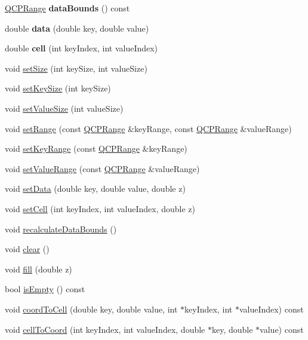 \begin{DoxyCompactItemize}
\item 
\hyperlink{classQCPRange}{Q\+C\+P\+Range} {\bfseries data\+Bounds} () const \hypertarget{classQCPColorMapData_a9ff433248ee226ea0c469ae6cc2489fd}{}\label{classQCPColorMapData_a9ff433248ee226ea0c469ae6cc2489fd}

\item 
double {\bfseries data} (double key, double value)\hypertarget{classQCPColorMapData_a2c33807b008cdb9e1394245c294c0eaf}{}\label{classQCPColorMapData_a2c33807b008cdb9e1394245c294c0eaf}

\item 
double {\bfseries cell} (int key\+Index, int value\+Index)\hypertarget{classQCPColorMapData_af51ecd21f347adbf87b4cce4e1f5cbd6}{}\label{classQCPColorMapData_af51ecd21f347adbf87b4cce4e1f5cbd6}

\item 
void \hyperlink{classQCPColorMapData_a0d9ff35c299d0478b682bfbcdd9c097e}{set\+Size} (int key\+Size, int value\+Size)
\item 
void \hyperlink{classQCPColorMapData_ac7ef70e383aface34b44dbde49234b6b}{set\+Key\+Size} (int key\+Size)
\item 
void \hyperlink{classQCPColorMapData_a0893c9e3914513048b45e3429ffd16f2}{set\+Value\+Size} (int value\+Size)
\item 
void \hyperlink{classQCPColorMapData_aad9c1c7c703c1339489fc730517c83d4}{set\+Range} (const \hyperlink{classQCPRange}{Q\+C\+P\+Range} \&key\+Range, const \hyperlink{classQCPRange}{Q\+C\+P\+Range} \&value\+Range)
\item 
void \hyperlink{classQCPColorMapData_a0738c485f3c9df9ea1241b7a8bb6a86e}{set\+Key\+Range} (const \hyperlink{classQCPRange}{Q\+C\+P\+Range} \&key\+Range)
\item 
void \hyperlink{classQCPColorMapData_ada1b2680ba96a5f4175b6d341cf75d23}{set\+Value\+Range} (const \hyperlink{classQCPRange}{Q\+C\+P\+Range} \&value\+Range)
\item 
void \hyperlink{classQCPColorMapData_afd2083ccfd6987ec94aa7ef8e91ca39a}{set\+Data} (double key, double value, double z)
\item 
void \hyperlink{classQCPColorMapData_a8e75eaf8746596319032a93f3d2d0683}{set\+Cell} (int key\+Index, int value\+Index, double z)
\item 
void \hyperlink{classQCPColorMapData_ab235ade8a4d64bd3adb26a99b3dd57ee}{recalculate\+Data\+Bounds} ()
\item 
void \hyperlink{classQCPColorMapData_a9910ba830e96955bd5c8e5bef1e77ef3}{clear} ()
\item 
void \hyperlink{classQCPColorMapData_a350f783260eb9b5de5c7b5e0d5d3e3c2}{fill} (double z)
\item 
bool \hyperlink{classQCPColorMapData_a986009324aee1fc5f696db46bd03dde5}{is\+Empty} () const 
\item 
void \hyperlink{classQCPColorMapData_a26e33c5ec7094b60136350bcd77d3737}{coord\+To\+Cell} (double key, double value, int $\ast$key\+Index, int $\ast$value\+Index) const 
\item 
void \hyperlink{classQCPColorMapData_ac96d6e84befe7b9951b5da6d4d4a2a47}{cell\+To\+Coord} (int key\+Index, int value\+Index, double $\ast$key, double $\ast$value) const 
\end{DoxyCompactItemize}
